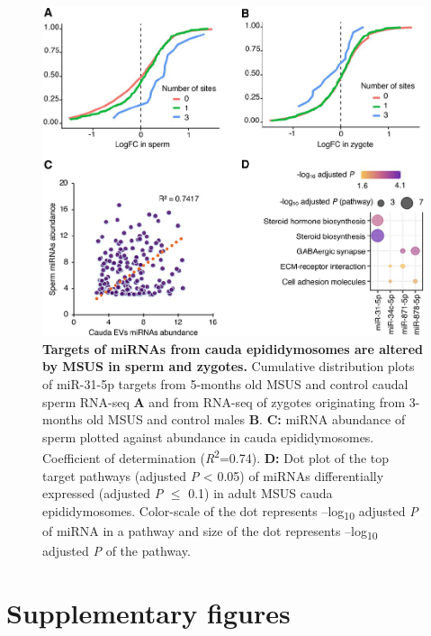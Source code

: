 \documentclass[12pt,twoside]{reedthesis}
\begin{document}
\begin{figure}[htbp]

{\centering \includegraphics{thesis_files/figure-latex/ef4-1} 

}

\caption{\textbf{Targets of miRNAs from cauda epididymosomes are altered by MSUS in sperm and zygotes.} \newline Cumulative distribution plots of miR-31-5p targets from 5-months old MSUS and control caudal sperm RNA-seq \textbf{A} and from RNA-seq of zygotes originating from 3-months old MSUS and control males \textbf{B}. \newline \textbf{C:} miRNA abundance of sperm plotted against abundance in cauda epididymosomes. Coefficient of determination (\emph{R}\textsuperscript{2}=0.74). \newline \textbf{D:} Dot plot of the top target pathways (adjusted \emph{P} \textless{} 0.05) of miRNAs differentially expressed (adjusted \emph{P} \(\leq\) 0.1) in adult MSUS cauda epididymosomes. Color-scale of the dot represents --log\textsubscript{10} adjusted \emph{P} of miRNA in a pathway and size of the dot represents --log\textsubscript{10} adjusted \emph{P} of the pathway.}\label{fig:ef4}
\end{figure}
\hypertarget{supplementary-figures-1}{%
\section{Supplementary figures}\label{supplementary-figures-1}}
\end{document}

